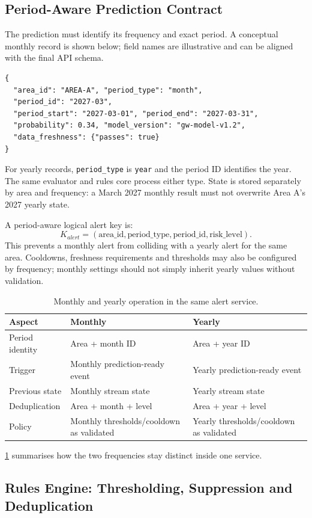 \documentclass[10pt,openany]{report}
\begin{document}
\subsection{Period-Aware Prediction Contract}
The prediction must identify its frequency and exact period. A conceptual monthly record is shown below; field names are illustrative and can be aligned with the final API schema.
\begin{verbatim}
{
  "area_id": "AREA-A", "period_type": "month",
  "period_id": "2027-03",
  "period_start": "2027-03-01", "period_end": "2027-03-31",
  "probability": 0.34, "model_version": "gw-model-v1.2",
  "data_freshness": {"passes": true}
}
\end{verbatim}
For yearly records, \texttt{period\_type} is \texttt{year} and the period ID identifies the year. The same evaluator and rules core process either type. State is stored separately by area and frequency: a March 2027 monthly result must not overwrite Area A's 2027 yearly state.

A period-aware logical alert key is:
\[
K_{alert}=(\text{area\_id},\text{period\_type},\text{period\_id},\text{risk\_level}).
\]
This prevents a monthly alert from colliding with a yearly alert for the same area. Cooldowns, freshness requirements and thresholds may also be configured by frequency; monthly settings should not simply inherit yearly values without validation.

\begin{table}[htbp]\centering\small
\caption{Monthly and yearly operation in the same alert service.}\label{tab:monthly-yearly}
\begin{tabular}{p{2.7cm}p{5.0cm}p{5.0cm}}\toprule
\textbf{Aspect}&\textbf{Monthly}&\textbf{Yearly}\\\midrule
Period identity&Area + month ID&Area + year ID\\
Trigger&Monthly prediction-ready event&Yearly prediction-ready event\\
Previous state&Monthly stream state&Yearly stream state\\
Deduplication&Area + month + level&Area + year + level\\
Policy&Monthly thresholds/cooldown as validated&Yearly thresholds/cooldown as validated\\\bottomrule
\end{tabular}\end{table}
\cref{tab:monthly-yearly} summarises how the two frequencies stay distinct inside one service.

\subsection{Rules Engine: Thresholding, Suppression and Deduplication}\label{sec:alert-rules}
\end{document}
